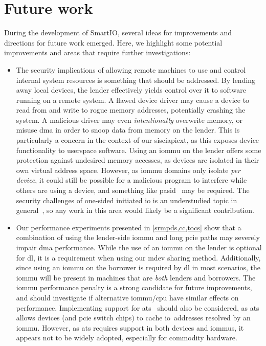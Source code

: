 \section{Future work}\label{sec:fw}
%
During the development of SmartIO, several ideas for improvements and directions for future work emerged.
%
Here, we highlight some potential improvements and areas that require further investigations:
%
\begin{itemize}
    \item The security implications of allowing remote machines to use and control internal system resources is something that should be addressed.
        By lending away local devices, the \gls{lender} effectively yields control over it to software running on a remote system.
        A flawed device driver may cause a device to read from and write to rogue memory addresses, potentially crashing the system.
        A malicious driver may even \emph{intentionally} overwrite memory, or misuse \gls{dma} in order to snoop data from memory on the \gls{lender}.
        This is particularly a concern in the context of our \gls{sisciapiext}, as this exposes device functionality to \gls{userspace} software.
        Using an \gls{iommu} on the \gls{lender} offers some protection against undesired memory accesses, as devices are isolated in their own virtual address space.
        However, as \gls{iommu} domains only isolate \emph{per device}, it could still be possible for a malicious program to interfere while others are using a device, and something like \gls{pasid}~\cite{spec:PASID} may be required.
        The security challenges of one-sided initiated \gls{io} is an understudied topic in general~\cite{Shinyeh2019}, so any work in this area would likely be a significant contribution.

    
    \item Our performance experiments presented in \cref{srmpds,cc,tocs} show that a combination of using the \gls{lender}-side \gls{iommu} and long \gls{pcie} paths may severely impair \gls{dma} performance.
        While the use of an \gls{iommu} on the lender is optional for \gls{dl}, it is a requirement when using our \gls{mdev} sharing method.
        Additionally, since using an \gls{iommu} on the \gls{borrower} is required by \gls{dl} in most scenarios, the \gls{iommu} will be present in machines that are \emph{both} \glspl{lender} and \glspl{borrower}.
        The \gls{iommu} performance penalty is a strong candidate for future improvements, and should investigate if alternative \gls{iommu}/\gls{cpu} have similar effects on performance.
        Implementing support for \gls{ats}~\cite{spec:ATS} should also be considered, as \gls{ats} allows devices (and \gls{pcie} switch chips) to cache \gls{io}~addresses resolved by an \gls{iommu}.
        However, as \gls{ats} requires support in both devices and \glspl{iommu}, it appears not to be widely adopted, especially for commodity hardware.

\end{itemize}
%

